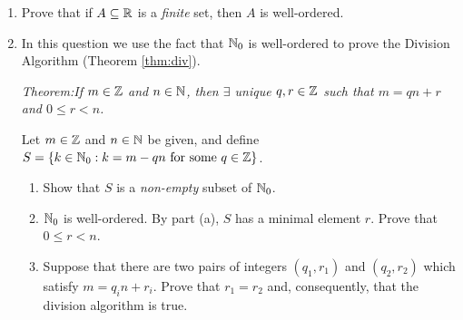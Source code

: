 \begin{exercises}{}{}
\begin{enumerate}
	\item Prove that if $A\subseteq\mathbb{R}$ is a \emph{finite} set, then $A$ is well-ordered.
  
	\item In this question we use the fact that $\mathbb{N}_0$ is well-ordered to prove the Division Algorithm (Theorem \ref{thm:div}).\par
	\emph{Theorem:\quad If $m\in\mathbb{Z}$ and $n\in\mathbb{N}$, then $\exists$ unique $q,r\in\mathbb{Z}$ such that $m=qn+r$ and $0\le r<n$.}\par
	
	Let $m\in\mathbb{Z}$ and $n\in\mathbb{N}$ be given, and define $S=\{k\in\mathbb{N}_0:k=m-qn\text{ for some }q\in\mathbb{Z}\}$.	
	\begin{enumerate}
		\item Show that $S$ is a \emph{non-empty} subset of $\mathbb{N}_0$.
		\item $\mathbb{N}_0$ is well-ordered. By part (a), $S$ has a minimal element $r$. Prove that $0\le r<n$.
		\item Suppose that there are two pairs of integers $(q_1,r_1)$ and $(q_2,r_2)$ which satisfy $m=q_in+r_i$. Prove that $r_1=r_2$ and, consequently, that the division algorithm is true.
	\end{enumerate}
	

\end{enumerate}
\end{exercises}
